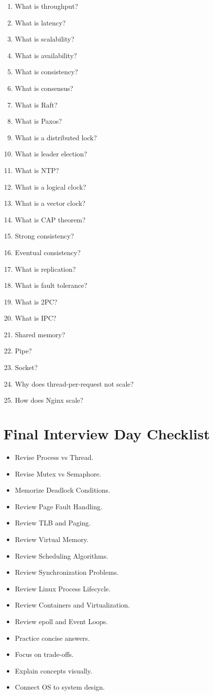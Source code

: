 \begin{enumerate}
\item What is throughput?
\item What is latency?
\item What is scalability?
\item What is availability?
\item What is consistency?
\item What is consensus?
\item What is Raft?
\item What is Paxos?
\item What is a distributed lock?
\item What is leader election?
\item What is NTP?
\item What is a logical clock?
\item What is a vector clock?
\item What is CAP theorem?
\item Strong consistency?
\item Eventual consistency?
\item What is replication?
\item What is fault tolerance?
\item What is 2PC?
\item What is IPC?
\item Shared memory?
\item Pipe?
\item Socket?
\item Why does thread-per-request not scale?
\item How does Nginx scale?
\end{enumerate}

\section{Final Interview Day Checklist}

\begin{itemize}
\item Revise Process vs Thread.
\item Revise Mutex vs Semaphore.
\item Memorize Deadlock Conditions.
\item Review Page Fault Handling.
\item Review TLB and Paging.
\item Review Virtual Memory.
\item Review Scheduling Algorithms.
\item Review Synchronization Problems.
\item Review Linux Process Lifecycle.
\item Review Containers and Virtualization.
\item Review epoll and Event Loops.
\item Practice concise answers.
\item Focus on trade-offs.
\item Explain concepts visually.
\item Connect OS to system design.
\end{itemize}

